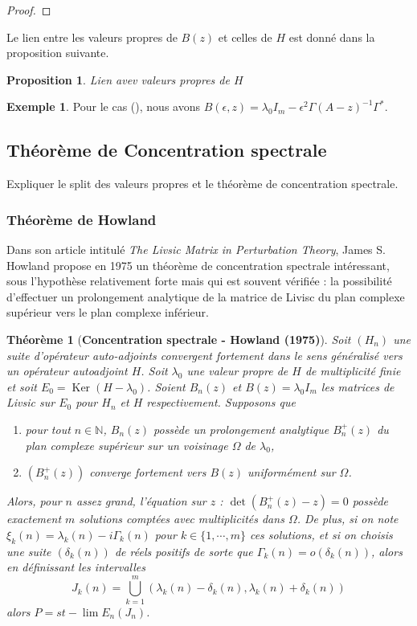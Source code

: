 \documentclass[12pt,openany,a4paper, titlepage]{article}
\newcommand{\lp}{\left(}
\newcommand{\rp}{\right)}
\newcommand{\N}{\mathbb{N}}
\newcommand{\inv}{^{-1}}
\newcommand{\Ker}{\operatorname{Ker}}
\newtheorem{prop}{Proposition}
\newtheorem{theo}{Théorème}
\theoremstyle{definition}
\theoremstyle{definition}
\theoremstyle{definition}
\newtheorem{ex}{Exemple}
\theoremstyle{definition}
\theoremstyle{definition}
\theoremstyle{definition}
\begin{document}
\begin{proof}
    
\end{proof}

Le lien entre les valeurs propres de $B(z)$ et celles de $H$ est donné dans la proposition suivante.

\begin{prop}
Lien avev valeurs propres de $H$    
\end{prop}

\begin{ex}
    Pour le cas (), nous avons $B(\epsilon,z) = \lambda_0 I_m - \epsilon^2\Gamma(A-z)\inv\Gamma^*$.
\end{ex}


\subsection{Théorème de Concentration spectrale}\label{concentration}

Expliquer le split des valeurs propres et le théorème de concentration spectrale.

\subsubsection{Théorème de Howland}

Dans son article intitulé \textit{The Livsic  Matrix in Perturbation Theory}, James S. Howland propose en 1975 un théorème de concentration spectrale intéressant, sous l'hypothèse relativement forte mais qui est souvent vérifiée : la possibilité d'effectuer un prolongement analytique de la matrice de Livisc du plan complexe supérieur vers le plan complexe inférieur.

\begin{theo}[\textbf{Concentration spectrale - Howland (1975)}]
Soit $(H_n)$ une suite d'opérateur auto-adjoints convergent fortement dans le sens généralisé vers un opérateur autoadjoint $H$. Soit $\lambda_0$ une valeur propre de $H$ de multiplicité finie et soit $E_0 = \Ker(H -\lambda_0)$. Soient $B_n(z)$  et $B(z) = \lambda_0 I_m$ les matrices de Livsic sur $E_0$ pour $H_n$ et $H$ respectivement. 
Supposons que \begin{enumerate}
    \item[(1)] pour tout $n\in\N$, $B_n(z)$ possède un prolongement analytique $B_n^+(z)$ du plan complexe supérieur sur un voisinage $ \Omega$ de $\lambda_0$,
    \item[(2)] $\lp B_n^+(z)\rp$ converge fortement vers $B(z)$ uniformément sur $\Omega$.
\end{enumerate}
Alors, pour $n$ assez grand, l'équation sur $z$ : $\det(B_n^+(z) -z) = 0 $ possède exactement $m$ solutions comptées avec multiplicités dans $\Omega$. De plus, si on note $\xi_k(n) = \lambda_k(n) - i \Gamma_k(n)$ pour $k\in\{1,\cdots,m\}$ ces solutions, et si on choisis une suite $(\delta_k(n))$ de réels positifs de sorte que $\Gamma_k(n) = o(\delta_k(n))$, alors en définissant les intervalles 
$$ J_k(n) = \bigcup_{k=1}^m (\lambda_k(n) - \delta_k(n),\lambda_k(n) + \delta_k(n))$$ alors $P = st-\lim E_n(J_n)$.
\end{theo}
\end{document}
